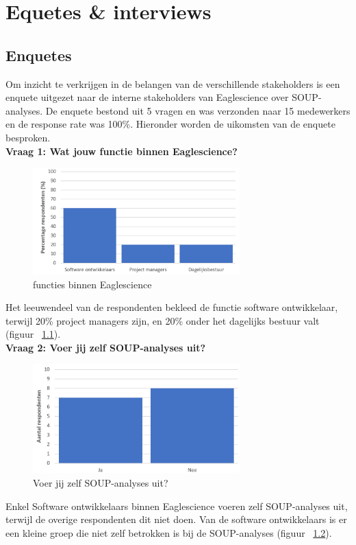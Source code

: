 
\chapter{Equetes \& interviews}\label{ch:Enquetes}
\section{Enquetes}\label{sec:enquetes}

Om inzicht te verkrijgen in de belangen van de verschillende stakeholders is een enquete uitgezet naar de interne stakeholders van Eaglescience over SOUP-analyses. De enquete bestond uit 5 vragen en was verzonden naar 15 medewerkers en de response rate was 100\%. Hieronder worden de uikomsten van de enquete besproken.\\

\textbf{Vraag 1: Wat jouw functie binnen Eaglescience?}\\
\begin{figure}[bth]
    \centering
    \includegraphics[width=8cm]{gfx/appendix/Vraag1}
    \caption{functies binnen Eaglescience}
    \label{fig:enqueteV1}
\end{figure}

Het leeuwendeel van de respondenten bekleed de functie software ontwikkelaar, terwijl 20\% project managers zijn, en 20\% onder het dagelijks bestuur valt (figuur ~\ref{fig:enqueteV1}).\\

\textbf{Vraag 2: Voer jij zelf SOUP-analyses uit?}\\
\begin{figure}[bth]
    \centering
    \includegraphics[width=8cm]{gfx/appendix/Vraag2}
    \caption{Voer jij zelf SOUP-analyses uit?}
    \label{fig:enqueteV2}
\end{figure}
Enkel Software ontwikkelaars binnen Eaglescience voeren zelf SOUP-analyses uit, terwijl de overige respondenten dit niet doen. Van de software ontwikkelaars is er een kleine groep die niet zelf betrokken is bij de SOUP-analyses (figuur ~\ref{fig:enqueteV2}).\\

